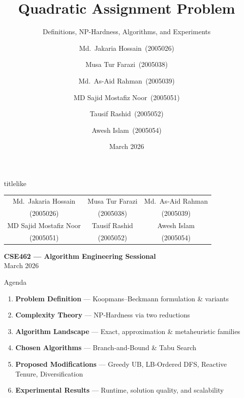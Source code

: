 \documentclass[aspectratio=169,11pt]{beamer}
\title[QAP]{Quadratic Assignment Problem}
\subtitle{Definitions, NP-Hardness, Algorithms, and Experiments}
\author[Group 1]{%
  Md.\ Jakaria Hossain~(2005026) \and
  Musa Tur Farazi~(2005038) \and
  Md.\ As-Aid Rahman~(2005039) \and
  MD Sajid Mostafiz Noor~(2005051) \and
  Tausif Rashid~(2005052) \and
  Awesh Islam~(2005054)}
\institute[CSE462]{CSE 462 --- Algorithm Engineering Lab}
\date{March 2026}
\begin{document}
{
\begin{frame}[plain]
\vfill
\begin{center}
  \begin{beamercolorbox}[wd=\textwidth,sep=12pt,center]{titlelike}
    \inserttitle\\[6pt]
    \insertsubtitle
  \end{beamercolorbox}
  \vspace{1.2em}
  {\small
  \begin{tabular}{ccc}
  Md.\ Jakaria Hossain & Musa Tur Farazi & Md.\ As-Aid Rahman\\
  (2005026) & (2005038) & (2005039)\\[6pt]
  MD Sajid Mostafiz Noor & Tausif Rashid & Awesh Islam\\
  (2005051) & (2005052) & (2005054)
  \end{tabular}
  }
  \vspace{1.2em}

  \textbf{CSE462 --- Algorithm Engineering Sessional}\\[4pt]
  March 2026
\end{center}
\vfill
\end{frame}
}

\begin{frame}{Agenda}
\begin{enumerate}\setlength\itemsep{10pt}
  \item \textbf{Problem Definition} --- Koopmans--Beckmann formulation \& variants
  \item \textbf{Complexity Theory} --- NP-Hardness via two reductions
  \item \textbf{Algorithm Landscape} --- Exact, approximation \& metaheuristic families
  \item \textbf{Chosen Algorithms} --- Branch-and-Bound \& Tabu Search
  \item \textbf{Proposed Modifications} --- Greedy UB, LB-Ordered DFS, Reactive Tenure, Diversification
  \item \textbf{Experimental Results} --- Runtime, solution quality, and scalability
\end{enumerate}
\end{frame}

\end{document}
